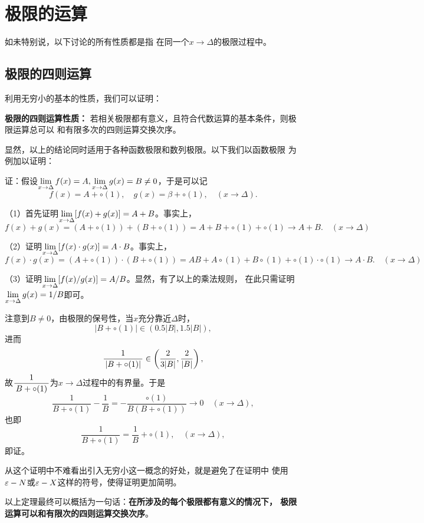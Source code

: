 \newpage
\section{极限的运算}

如未特别说，以下讨论的所有性质都是指
在同一个$x\to\Delta$的极限过程中。

\subsection{极限的四则运算}

利用无穷小的基本的性质，我们可以证明：

\begin{thx}
	{\bf 极限的四则运算性质：}
	若相关极限都有意义，且符合代数运算的基本条件，则极限运算总可以
	和有限多次的四则运算交换次序。
\end{thx}

显然，以上的结论同时适用于各种函数极限和数列极限。以下我们以函数极限
为例加以证明：

证：假设$\lim\limits_{x\to{\Delta}}f(x)=A,\lim\limits_{x\to{\Delta}}g(x)=B\ne 0$，于是可以记
$$f(x)=A+\circ(1),\quad g(x)=\beta+\circ(1),\quad (x\to\Delta).$$

（1）首先证明$\lim\limits_{x\to{\Delta}}[f(x)+g(x)]=A+B$。事实上，
$$f(x)+g(x)=(A+\circ(1))+(B+\circ(1))=A+B+\circ(1)+\circ(1)\to A+B.
\quad (x\to\Delta)$$

（2）证明$\lim\limits_{x\to{\Delta}}[f(x)\cdot g(x)]=A\cdot B$。事实上，
$$f(x)\cdot g(x)=(A+\circ(1))\cdot (B+\circ(1))
=AB+A\circ(1)+B\circ(1)+\circ(1)\cdot\circ(1)\to A\cdot B.
\quad (x\to\Delta)$$

（3）证明$\lim\limits_{x\to{\Delta}}[f(x)/g(x)]=A/B$。显然，有了以上的乘法规则，
在此只需证明$\lim\limits_{x\to{\Delta}}g(x)=1/B$即可。

注意到$B\ne 0$，由极限的保号性，当$x$充分靠近$\Delta$时，
$$|B+\circ(1)|\in(0.5|B|,1.5|B|),$$
进而
$$\displaystyle\frac{\,{1}\,}{\,{|B+\circ(1)|}\,}\in\left(\frac2{3|B|},\frac2{|B|}\right),$$
故$\displaystyle\frac{\,{1}\,}{\,{B+\circ(1)}\,}$为$x\to\Delta$过程中的有界量。于是
$$\frac{1}{B+\circ(1)}-\frac{1}{B}=-\frac{\circ(1)}{B(B+\circ(1))}
\to0\quad(x\to\Delta),$$
也即
$$\frac{1}{B+\circ(1)}=\frac{1}{B}+\circ(1),\quad(x\to\Delta),$$
即证。\fin

从这个证明中不难看出引入无穷小这一概念的好处，就是避免了在证明中
使用$\varepsilon-N$或$\varepsilon-X$这样的符号，使得证明更加简明。

以上定理最终可以概括为一句话：{\bf 在所涉及的每个极限都有意义的情况下，
极限运算可以和有限次的四则运算交换次序}。

